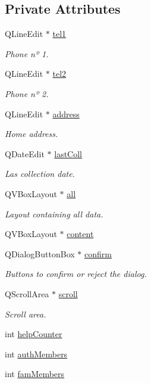 \subsection*{Private Attributes}
\begin{DoxyCompactItemize}
\item 
Q\+Line\+Edit $\ast$ \hyperlink{class_ins_dialog_a7dc562149fa67417983c78fe2621d7f9}{tel1}
\begin{DoxyCompactList}\small\item\em Phone nº 1. \end{DoxyCompactList}\item 
Q\+Line\+Edit $\ast$ \hyperlink{class_ins_dialog_a79832ba6767602ed1d07b9b707bbfd1f}{tel2}
\begin{DoxyCompactList}\small\item\em Phone nº 2. \end{DoxyCompactList}\item 
Q\+Line\+Edit $\ast$ \hyperlink{class_ins_dialog_a14da50d5cdf18e266b1d198ebbd20770}{address}
\begin{DoxyCompactList}\small\item\em Home address. \end{DoxyCompactList}\item 
Q\+Date\+Edit $\ast$ \hyperlink{class_ins_dialog_a945a99c1652d647dbab8dc25df556828}{last\+Coll}
\begin{DoxyCompactList}\small\item\em Las collection date. \end{DoxyCompactList}\item 
Q\+V\+Box\+Layout $\ast$ \hyperlink{class_ins_dialog_ab8de5f3cd72b44a3b3524fc52bac148c}{all}
\begin{DoxyCompactList}\small\item\em Layout containing all data. \end{DoxyCompactList}\item 
Q\+V\+Box\+Layout $\ast$ \hyperlink{class_ins_dialog_a9b0df6254c3f39e812bbeb0ef85c1d0c}{content}
\item 
Q\+Dialog\+Button\+Box $\ast$ \hyperlink{class_ins_dialog_aa77dfa096f7cd3bc82823f6944ecbd8b}{confirm}
\begin{DoxyCompactList}\small\item\em Buttons to confirm or reject the dialog. \end{DoxyCompactList}\item 
Q\+Scroll\+Area $\ast$ \hyperlink{class_ins_dialog_a822e0887cf9597f75ed5c4a772a8c9db}{scroll}
\begin{DoxyCompactList}\small\item\em Scroll area. \end{DoxyCompactList}\item 
int \hyperlink{class_ins_dialog_aa67a0256243ba4ca9bb6623610ad3f3a}{help\+Counter}
\item 
int \hyperlink{class_ins_dialog_a665468f228a04cf077de009d22736f21}{auth\+Members}
\item 
int \hyperlink{class_ins_dialog_ac1fbb6dd4e8c3828826a98c3946935a3}{fam\+Members}
\end{DoxyCompactItemize}


